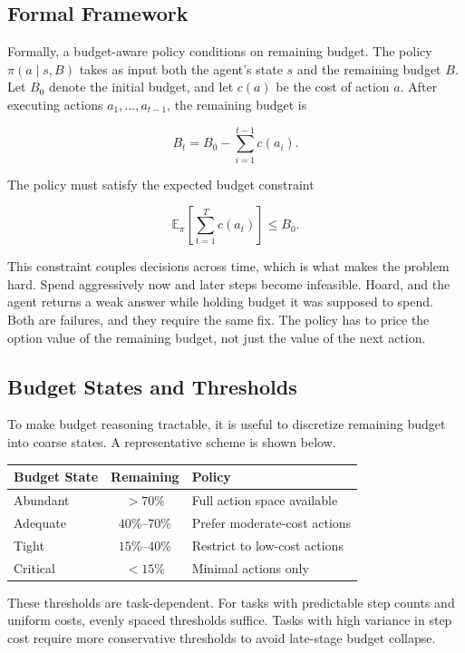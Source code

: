 \subsection{Formal Framework}

Formally, a budget-aware policy conditions on remaining budget. The policy $\pi(a \mid s, B)$ takes as input both the agent’s state $s$ and the remaining budget $B$. Let $B_0$ denote the initial budget, and let $c(a)$ be the cost of action $a$. After executing actions $a_1, \ldots, a_{t-1}$, the remaining budget is

\[
B_t = B_0 - \sum_{i=1}^{t-1} c(a_i).
\]

The policy must satisfy the expected budget constraint

\[
\mathbb{E}_\pi\!\left[\sum_{t=1}^{T} c(a_t)\right] \leq B_0.
\]

This constraint couples decisions across time, which is what makes the problem hard. Spend aggressively now and later steps become infeasible. Hoard, and the agent returns a weak answer while holding budget it was supposed to spend. Both are failures, and they require the same fix. The policy has to price the option value of the remaining budget, not just the value of the next action.

\subsection{Budget States and Thresholds}

To make budget reasoning tractable, it is useful to discretize remaining budget into coarse states. A representative scheme is shown below.

\begin{center}
\begin{tabular}{lcl}
\toprule
Budget State & Remaining & Policy \\
\midrule
Abundant & $> 70\%$ & Full action space available \\
Adequate & $40\%$--$70\%$ & Prefer moderate-cost actions \\
Tight & $15\%$--$40\%$ & Restrict to low-cost actions \\
Critical & $< 15\%$ & Minimal actions only \\
\bottomrule
\end{tabular}
\end{center}

These thresholds are task-dependent. For tasks with predictable step counts and uniform costs, evenly spaced thresholds suffice. Tasks with high variance in step cost require more conservative thresholds to avoid late-stage budget collapse.

